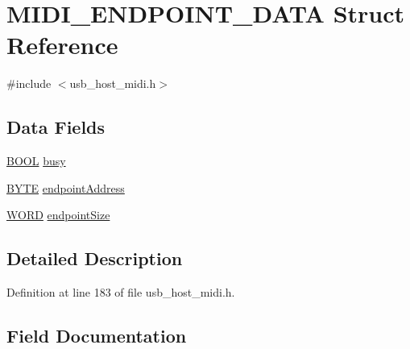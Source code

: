 \hypertarget{struct_m_i_d_i___e_n_d_p_o_i_n_t___d_a_t_a}{}\section{M\+I\+D\+I\+\_\+\+E\+N\+D\+P\+O\+I\+N\+T\+\_\+\+D\+A\+T\+A Struct Reference}
\label{struct_m_i_d_i___e_n_d_p_o_i_n_t___d_a_t_a}


{\ttfamily \#include $<$usb\+\_\+host\+\_\+midi.\+h$>$}

\subsection*{Data Fields}
\begin{DoxyCompactItemize}
\item 
\hyperlink{_generic_type_defs_8h_a54d65c7fa62e62c9754371e42f5111b9}{B\+O\+O\+L} \hyperlink{struct_m_i_d_i___e_n_d_p_o_i_n_t___d_a_t_a_a70f231df37533cb38517a4c232d3ea36}{busy}
\item 
\hyperlink{_generic_type_defs_8h_a4ae1dab0fb4b072a66584546209e7d58}{B\+Y\+T\+E} \hyperlink{struct_m_i_d_i___e_n_d_p_o_i_n_t___d_a_t_a_a6c0560f3ba69f753f9dd2b88cbce1f4f}{endpoint\+Address}
\item 
\hyperlink{_generic_type_defs_8h_a2b0e863dadf920709ec53d9088ee7c91}{W\+O\+R\+D} \hyperlink{struct_m_i_d_i___e_n_d_p_o_i_n_t___d_a_t_a_a741c25067a940ada7a600e4c7fb55d44}{endpoint\+Size}
\end{DoxyCompactItemize}


\subsection{Detailed Description}


Definition at line 183 of file usb\+\_\+host\+\_\+midi.\+h.



\subsection{Field Documentation}
\hypertarget{struct_m_i_d_i___e_n_d_p_o_i_n_t___d_a_t_a_a70f231df37533cb38517a4c232d3ea36}{}
